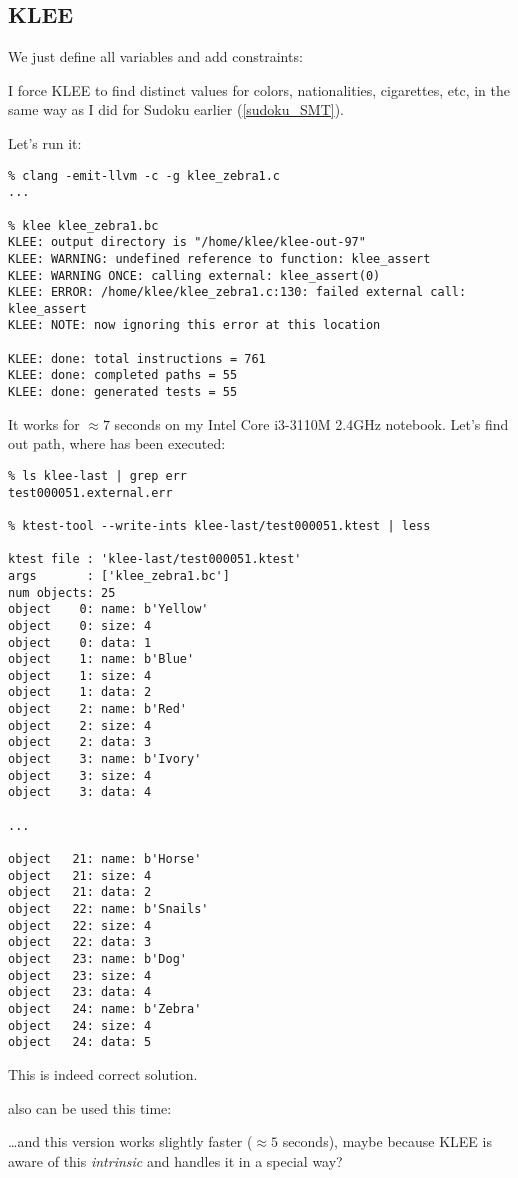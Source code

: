 \subsection{KLEE}

\renewcommand{\CURPATH}{puzzles/zebra/KLEE}

We just define all variables and add constraints:



I force KLEE to find distinct values for colors, nationalities, cigarettes, etc, in the same way as I did for Sudoku earlier 
(\ref{sudoku_SMT}).

Let's run it:

\begin{lstlisting}
% clang -emit-llvm -c -g klee_zebra1.c
...

% klee klee_zebra1.bc
KLEE: output directory is "/home/klee/klee-out-97"
KLEE: WARNING: undefined reference to function: klee_assert
KLEE: WARNING ONCE: calling external: klee_assert(0)
KLEE: ERROR: /home/klee/klee_zebra1.c:130: failed external call: klee_assert
KLEE: NOTE: now ignoring this error at this location

KLEE: done: total instructions = 761
KLEE: done: completed paths = 55
KLEE: done: generated tests = 55
\end{lstlisting}

It works for $\approx 7$ seconds on my Intel Core i3-3110M 2.4GHz notebook.
Let's find out path, where  has been executed:

\begin{lstlisting}
% ls klee-last | grep err
test000051.external.err

% ktest-tool --write-ints klee-last/test000051.ktest | less

ktest file : 'klee-last/test000051.ktest'
args       : ['klee_zebra1.bc']
num objects: 25
object    0: name: b'Yellow'
object    0: size: 4
object    0: data: 1
object    1: name: b'Blue'
object    1: size: 4
object    1: data: 2
object    2: name: b'Red'
object    2: size: 4
object    2: data: 3
object    3: name: b'Ivory'
object    3: size: 4
object    3: data: 4

...

object   21: name: b'Horse'
object   21: size: 4
object   21: data: 2
object   22: name: b'Snails'
object   22: size: 4
object   22: data: 3
object   23: name: b'Dog'
object   23: size: 4
object   23: data: 4
object   24: name: b'Zebra'
object   24: size: 4
object   24: data: 5
\end{lstlisting}

This is indeed correct solution.

 also can be used this time:



\dots and this version works slightly faster ($\approx 5$ seconds),
maybe because KLEE is aware of this \textit{intrinsic} and handles it in a special way?

